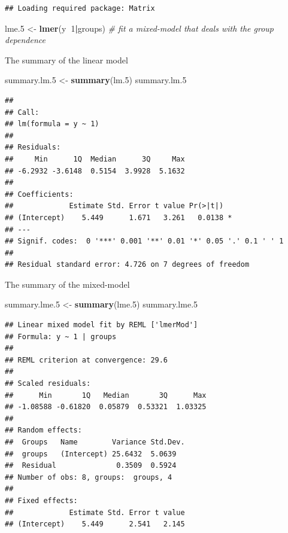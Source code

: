 \documentclass[]{book}
\newenvironment{Shaded}{\begin{snugshade}}{\end{snugshade}}
\newcommand{\CommentTok}[1]{\textcolor[rgb]{0.56,0.35,0.01}{\textit{#1}}}
\newcommand{\DecValTok}[1]{\textcolor[rgb]{0.00,0.00,0.81}{#1}}
\newcommand{\FloatTok}[1]{\textcolor[rgb]{0.00,0.00,0.81}{#1}}
\newcommand{\KeywordTok}[1]{\textcolor[rgb]{0.13,0.29,0.53}{\textbf{#1}}}
\newcommand{\NormalTok}[1]{#1}
\newcommand{\OperatorTok}[1]{\textcolor[rgb]{0.81,0.36,0.00}{\textbf{#1}}}
\newcommand{\StringTok}[1]{\textcolor[rgb]{0.31,0.60,0.02}{#1}}
\theoremstyle{definition}
\theoremstyle{definition}
\theoremstyle{definition}
\theoremstyle{remark}
\begin{document}
\begin{verbatim}
## Loading required package: Matrix
\end{verbatim}

\begin{Shaded}
\begin{Highlighting}[]
\NormalTok{lme}\FloatTok{.5}\NormalTok{ <-}\StringTok{ }\KeywordTok{lmer}\NormalTok{(y}\OperatorTok{~}\DecValTok{1}\OperatorTok{|}\NormalTok{groups) }\CommentTok{# fit a mixed-model that deals with the group dependence}
\end{Highlighting}
\end{Shaded}

The summary of the linear model

\begin{Shaded}
\begin{Highlighting}[]
\NormalTok{summary.lm}\FloatTok{.5}\NormalTok{ <-}\StringTok{ }\KeywordTok{summary}\NormalTok{(lm}\FloatTok{.5}\NormalTok{)}
\NormalTok{summary.lm}\FloatTok{.5}
\end{Highlighting}
\end{Shaded}

\begin{verbatim}
## 
## Call:
## lm(formula = y ~ 1)
## 
## Residuals:
##     Min      1Q  Median      3Q     Max 
## -6.2932 -3.6148  0.5154  3.9928  5.1632 
## 
## Coefficients:
##             Estimate Std. Error t value Pr(>|t|)  
## (Intercept)    5.449      1.671   3.261   0.0138 *
## ---
## Signif. codes:  0 '***' 0.001 '**' 0.01 '*' 0.05 '.' 0.1 ' ' 1
## 
## Residual standard error: 4.726 on 7 degrees of freedom
\end{verbatim}

The summary of the mixed-model

\begin{Shaded}
\begin{Highlighting}[]
\NormalTok{summary.lme}\FloatTok{.5}\NormalTok{ <-}\StringTok{ }\KeywordTok{summary}\NormalTok{(lme}\FloatTok{.5}\NormalTok{)}
\NormalTok{summary.lme}\FloatTok{.5}
\end{Highlighting}
\end{Shaded}

\begin{verbatim}
## Linear mixed model fit by REML ['lmerMod']
## Formula: y ~ 1 | groups
## 
## REML criterion at convergence: 29.6
## 
## Scaled residuals: 
##      Min       1Q   Median       3Q      Max 
## -1.08588 -0.61820  0.05879  0.53321  1.03325 
## 
## Random effects:
##  Groups   Name        Variance Std.Dev.
##  groups   (Intercept) 25.6432  5.0639  
##  Residual              0.3509  0.5924  
## Number of obs: 8, groups:  groups, 4
## 
## Fixed effects:
##             Estimate Std. Error t value
## (Intercept)    5.449      2.541   2.145
\end{verbatim}
\end{document}
